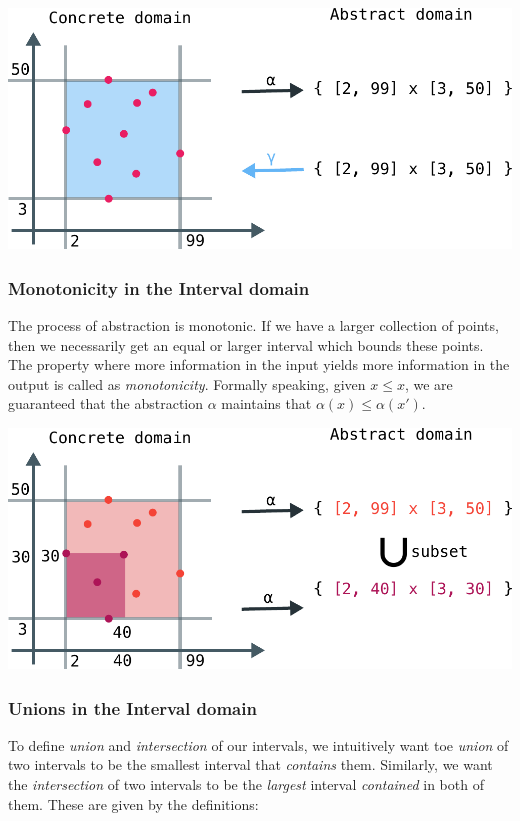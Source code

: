 \documentclass[11pt]{book}
\begin{document}
\includegraphics[width=\textwidth]{./alpha-gamma-intervals.pdf}



\subsubsection{Monotonicity in the Interval domain}

The process of abstraction is monotonic. If we have a larger collection of points, then we necessarily
get an equal or larger interval which bounds these points. The property where more information
in the input yields more information in the output is called as \emph{monotonicity}. Formally speaking,
given $x \leq x$, we are guaranteed that the abstraction $\alpha$ maintains that $\alpha(x) \leq \alpha(x')$.

\includegraphics[width=\textwidth]{./monotone.pdf}

\subsubsection{Unions in the Interval domain}

To define \emph{union} and \emph{intersection} of our intervals, we intuitively
want toe \emph{union} of two intervals to be the smallest interval that \emph{contains} them.
Similarly, we want the \emph{intersection} of two intervals to be the \emph{largest} interval
\emph{contained} in both of them. These are given by the definitions:
\end{document}
